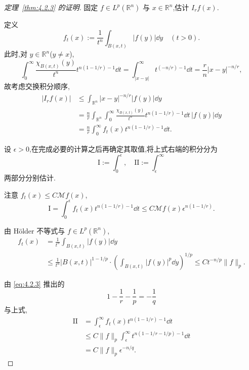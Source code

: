 \begin{proof}[定理~\ref{thm:4.2.3} 的证明]
固定 $f \in L^{p}(\mathbb{R}^{n})$ 与 $x \in \mathbb{R}^{n}$,估计 $I_{r}f(x)$.

定义
\begin{equation*}
f_{t}(x) := \frac{1}{t^{n}}\int_{B(x,t)}|f(y)|\dd y \quad (t > 0).
\end{equation*}
此时,对 $y \in \mathbb{R}^{n}$($y \neq x$),
\begin{equation*}
\int_{0}^{\infty}\frac{\chi_{B(x,t)}(y)}{t^{n}}t^{n(1-1/r)-1}\dd t = \int_{|x-y|}^{\infty}t^{(-n/r)-1}\dd t = \frac{r}{n}|x-y|^{-n/r},
\end{equation*}
故考虑交换积分顺序,
\begin{equation}
\begin{aligned}
|I_{r}f(x)| & \leq \int_{\mathbb{R}^{n}}|x-y|^{-n/r}|f(y)|\dd y \\
& = \frac{n}{r}\int_{\mathbb{R}^{n}}\int_{0}^{\infty}\frac{\chi_{B(x,t)}(y)}{t^{n}}t^{n(1-1/r)-1}\dd t\,|f(y)|\dd y \\
& = \frac{n}{r}\int_{0}^{\infty}f_{t}(x)t^{n(1-1/r)-1}\dd t.
\end{aligned}
\end{equation}

设 $\epsilon > 0$,在完成必要的计算之后再确定其取值,将上式右端的积分分为
\begin{equation*}
\mathrm{I} := \int_{0}^{\epsilon}, \quad \mathrm{II} := \int_{\epsilon}^{\infty}
\end{equation*}
两部分分别估计.

注意 $f_{t}(x) \leq C\mathcal{M}f(x)$,
\begin{equation*}
\mathrm{I} = \int_{0}^{\epsilon}f_{t}(x)t^{n(1-1/r)-1}\dd t \leq C\mathcal{M}f(x)\epsilon^{n(1-1/r)}.
\end{equation*}

由 Hölder 不等式与 $f \in L^{p}(\mathbb{R}^{n})$,
\begin{equation}
\begin{aligned}
f_{t}(x) & = \frac{1}{t^{n}}\int_{B(x,t)}|f(y)|\dd y \\
& \leq \frac{1}{t^{n}}|B(x,t)|^{1-1/p}\cdot\left(\int_{B(x,t)}|f(y)|^{p}\dd y\right)^{1/p} \leq Ct^{-n/p}\|f\|_{p}.
\end{aligned}
\end{equation}

由 \eqref{eq:4.2.3} 推出的
\begin{equation*}
1 - \frac{1}{r} - \frac{1}{p} = -\frac{1}{q}
\end{equation*}
与上式,
\begin{equation}
\begin{aligned}
\mathrm{II} &= \int_{\epsilon}^{\infty}f_{t}(x)t^{n(1-1/r)-1}\dd t \\
&\leq C\|f\|_{p}\int_{\epsilon}^{\infty}t^{n(1-1/r-1/p)-1}\dd t \\
&= C\|f\|_{p}\epsilon^{-n/q}.
\end{aligned}
\end{equation}


\end{proof}
